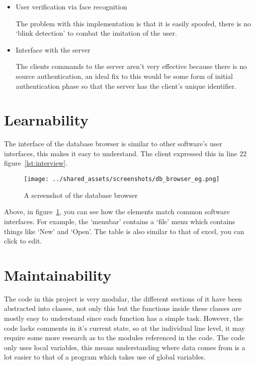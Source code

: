 \documentclass[a4paper]{article}
\begin{document}
		\begin{itemize}
			\item User verification via face recognition

			The problem with this implementation is that it is easily spoofed, there is no `blink detection' to combat the imitation of the user. 

			\item Interface with the server

			The clients commands to the server aren't very effective because there is no source authentication, an ideal fix to this would be some form of
			initial authentication phase so that the server has the client's unique identifier.
		\end{itemize}


\section{Learnability}
	The interface of the database browser is similar to other software's user interfaces, this makes it easy to understand. The client expressed this in
	line 22 figure~\ref{lst:interview}.

	\begin{figure}
		\begin{center}
		\caption{A screenshot of the database browser}
		\label{fig:db_browser}
		\texttt{[image: ../shared\_assets/screenshots/db\_browser\_eg.png]}
		\end{center}
	\end{figure}

	Above, in figure~\ref{fig:db_browser}, you can see how the elements match common software interfaces. For example, the `menubar' contains a `file'
	menu which contains things like `New' and `Open'. The table is also similar to that of excel, you can click to edit. 


\section{Maintainability}

	The code in this project is very modular, the different sections of it have been abstracted into classes, not only this but the functions inside these
	classes are mostly easy to understand since each function has a simple task. However, the code lacks comments in it's current state, so at the individual
	line level, it may require some more research as to the modules referenced in the code. The code only uses local variables, this means understanding where
	data comes from is a lot easier to that of a program which takes use of global variables.
\end{document}
